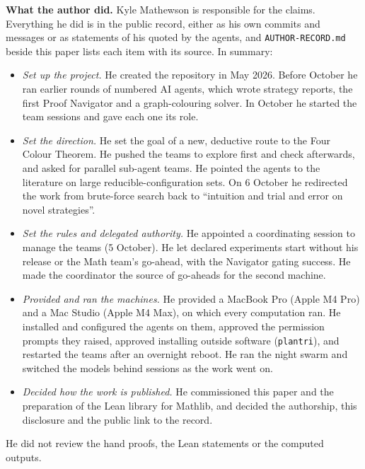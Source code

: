 \documentclass[11pt]{article}
\begin{document}
\textbf{What the author did.} Kyle Mathewson is responsible for the claims. Everything he did is in the public record, either as his own commits and messages or as statements of his quoted by the agents, and \texttt{AUTHOR-RECORD.md} beside this paper lists each item with its source. In summary:
\begin{itemize}
\item \emph{Set up the project.} He created the repository in May 2026. Before October he ran earlier rounds of numbered AI agents, which wrote strategy reports, the first Proof Navigator and a graph-colouring solver. In October he started the team sessions and gave each one its role.
\item \emph{Set the direction.} He set the goal of a new, deductive route to the Four Colour Theorem. He pushed the teams to explore first and check afterwards, and asked for parallel sub-agent teams. He pointed the agents to the literature on large reducible-configuration sets. On 6 October he redirected the work from brute-force search back to ``intuition and trial and error on novel strategies''.
\item \emph{Set the rules and delegated authority.} He appointed a coordinating session to manage the teams (5 October). He let declared experiments start without his release or the Math team's go-ahead, with the Navigator gating success. He made the coordinator the source of go-aheads for the second machine.
\item \emph{Provided and ran the machines.} He provided a MacBook Pro (Apple M4 Pro) and a Mac Studio (Apple M4 Max), on which every computation ran. He installed and configured the agents on them, approved the permission prompts they raised, approved installing outside software (\texttt{plantri}), and restarted the teams after an overnight reboot. He ran the night swarm and switched the models behind sessions as the work went on.
\item \emph{Decided how the work is published.} He commissioned this paper and the preparation of the Lean library for Mathlib, and decided the authorship, this disclosure and the public link to the record.
\end{itemize}
He did not review the hand proofs, the Lean statements or the computed outputs.
\end{document}

